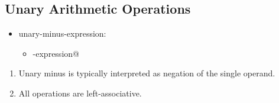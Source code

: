 \subsection{Unary Arithmetic Operations}
\begin{itemize}[before=\itshape, label={}]
	\item unary-minus-expression:
	\begin{itemize}[before=\itshape, label={}]
		\item \lstinline@-expression@
	\end{itemize}
\end{itemize}
\begin{enumerate}
	\item Unary minus is typically interpreted as negation of the single operand.
	\item All operations are left-associative.
\end{enumerate}
